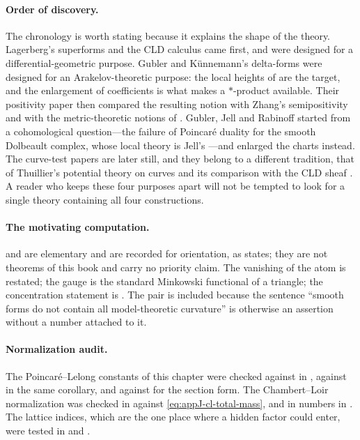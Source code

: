 \paragraph{Order of discovery.}
The chronology is worth stating because it explains the shape of the
theory.  Lagerberg's superforms and the CLD calculus came first, and were
designed for a differential-geometric purpose.  Gubler and K\"unnemann's
delta-forms \cite{GK17} were designed for an Arakelov-theoretic purpose:
the local heights of  are the target, and the
enlargement of coefficients is what makes a \(*\)-product available.  Their
positivity paper \cite{GK19} then compared the resulting notion with
Zhang's semipositivity \cite{Zhang1995} and with the metric-theoretic
notions of \cite{GM19}.  Gubler, Jell and Rabinoff \cite{GJR26} started from
a cohomological question---the failure of Poincar\'e duality for the smooth
Dolbeault complex, whose local theory is Jell's \cite{Jell16}---and enlarged
the charts instead.  The curve-test papers \cite{GR25PL,GR25Classical} are
later still, and they belong to a different tradition, that of Thuillier's
potential theory on curves and its comparison with the CLD sheaf
\cite{Wanner19}.  A reader who keeps these four purposes apart will not be
tempted to look for a single theory containing all four constructions.

\paragraph{The motivating computation.}
 and  are
elementary and are recorded for orientation, as
 states; they are not theorems of this book
and carry no priority claim.  The vanishing of the atom is
 restated; the gauge is the standard
Minkowski functional of a triangle; the concentration statement is
.  The pair is included because the sentence
``smooth forms do not contain all model-theoretic curvature'' is otherwise
an assertion without a number attached to it.

\paragraph{Normalization audit.}
The Poincar\'e--Lelong constants of this chapter were checked against
 in , against
 in the same corollary, and against
 for the section form.  The Chambert--Loir
normalization was checked in  against
\eqref{eq:appJ-cl-total-mass}, and in numbers in
.
The lattice indices, which are the one place where a hidden factor could
enter, were tested in  and
.

